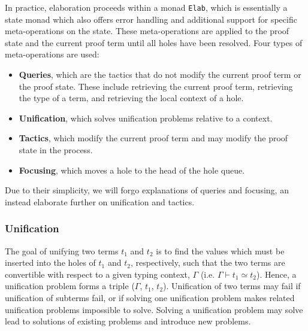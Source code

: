 In practice, elaboration proceeds within a monad \texttt{Elab}, which is
essentially a state monad which also offers error handling and additional
support for specific meta-operations on the state. These meta-operations are
applied to the proof state and the current proof term until all holes have been
resolved. Four types of meta-operations are used:
\begin{itemize}
\item \textbf{Queries}, which are the tactics that do not modify the current
  proof term or the proof state. These include retrieving the current proof
  term, retrieving the type of a term, and retrieving the local context of a hole.
\item \textbf{Unification}, which solves unification problems relative to a context.
\item \textbf{Tactics}, which modify the current proof term and may modify the
  proof state in the process.
\item \textbf{Focusing}, which moves a hole to the head of the hole queue.
\end{itemize}
Due to their simplicity, we will forgo explanations of queries and
focusing, an instead elaborate further on unification and tactics.

\subsubsection{Unification}
The goal of unifying two terms $t_{1}$ and $t_{2}$ is to find the values which
must be inserted into the holes of $t_{1}$ and $t_{2}$, respectively, such that
the two terms are convertible with respect to a given typing context, $\Gamma$
(i.e. $\Gamma\vdash t_{1} \simeq t_{2}$). Hence, a unification problem forms a
triple ($\Gamma$, $t_{1}$, $t_{2}$). Unification of two terms may fail if
unification of subterms fail, or if solving one unification problem makes
related unification problems impossible to solve. Solving a unification problem
may solve lead to solutions of existing problems and introduce new problems.


